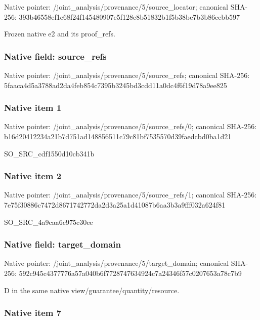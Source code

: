 \documentclass[10pt,a4paper]{article}
\begin{document}
Native pointer: /joint\_analysis/provenan\allowbreak{}ce/5/source\_locator; canonical SHA-256: 393b46558ef1e68f24f14548\allowbreak{}0907e5f128e8b51832b1f5b3\allowbreak{}8be7b3b86eebb597


Frozen native e2 and its proof\_refs.


\subsubsection{Native field: source\_refs}


Native pointer: /joint\_analysis/provenan\allowbreak{}ce/5/source\_refs; canonical SHA-256: 5faaca4d5a3788ad2da4feb8\allowbreak{}54c7395b3245bd3cdd11a0dc\allowbreak{}4f6f19d78a9ee825



\subsubsection{Native item 1}


Native pointer: /joint\_analysis/provenan\allowbreak{}ce/5/source\_refs/0; canonical SHA-256: b16d20412234a21b7d751ad1\allowbreak{}48856511c79c81bf7535570d\allowbreak{}39faedcbd0ba1d21


SO\_SRC\_cdf1550d10cb341b


\subsubsection{Native item 2}


Native pointer: /joint\_analysis/provenan\allowbreak{}ce/5/source\_refs/1; canonical SHA-256: 7e75f30886c7472d86717427\allowbreak{}72da2d3a25a1d41087b6aa3b\allowbreak{}3a9fff032a624f81


SO\_SRC\_4a9caa6c975c30ce


\subsubsection{Native field: target\_domain}


Native pointer: /joint\_analysis/provenan\allowbreak{}ce/5/target\_domain; canonical SHA-256: 592c945c4377776a57a040b6\allowbreak{}f7728747634924c7a24346f5\allowbreak{}7c0207653a78c7b9


D in the same native view/guarantee/quantity/resource.


\subsubsection{Native item 7}
\end{document}
